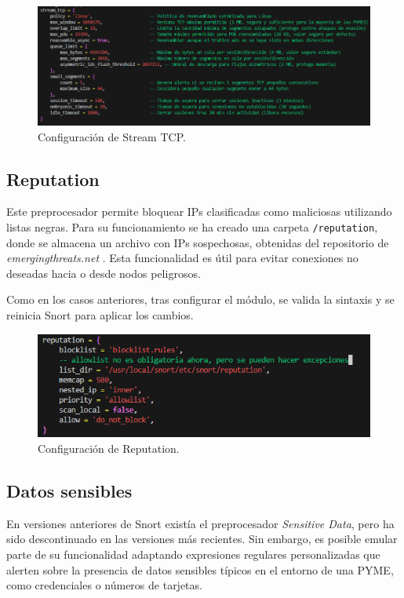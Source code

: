 \documentclass[11pt,a4paper,twoside]{report}
\begin{document}
\begin{figure}[H]
	\centering
	\includegraphics[scale=0.6]{stream_tcp/1.png}
	\caption{Configuración de Stream TCP.}
\end{figure}

\subsection{Reputation}

Este preprocesador permite bloquear IPs clasificadas como maliciosas utilizando listas negras. Para su funcionamiento se ha creado una carpeta \texttt{/reputation}, donde se almacena un archivo con IPs sospechosas, obtenidas del repositorio de \textit{emergingthreats.net} \cite{emerging_block_ips}.  Esta funcionalidad es útil para evitar conexiones no deseadas hacia o desde nodos peligrosos.\newline

Como en los casos anteriores, tras configurar el módulo, se valida la sintaxis y se reinicia Snort para aplicar los cambios.

\begin{figure}[H]
	\centering
	\includegraphics[scale=0.8]{reputation/1.png}
	\caption{Configuración de Reputation.}
\end{figure}

\newpage

\subsection{Datos sensibles}

En versiones anteriores de Snort existía el preprocesador \textit{Sensitive Data}, pero ha sido descontinuado en las versiones más recientes. Sin embargo, es posible emular parte de su funcionalidad adaptando expresiones regulares personalizadas que alerten sobre la presencia de datos sensibles típicos en el entorno de una PYME, como credenciales o números de tarjetas.\newline
\end{document}
